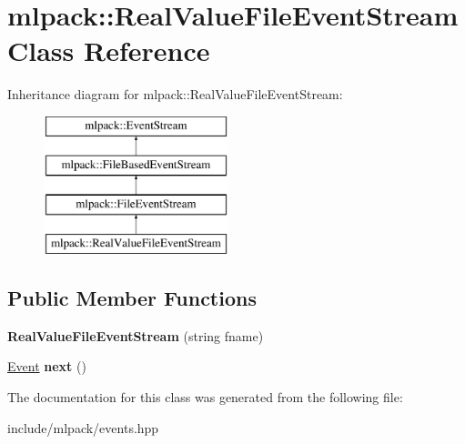 \hypertarget{classmlpack_1_1_real_value_file_event_stream}{
\section{mlpack::RealValueFileEventStream Class Reference}
\label{classmlpack_1_1_real_value_file_event_stream}
}
Inheritance diagram for mlpack::RealValueFileEventStream:\begin{figure}[H]
\begin{center}
\leavevmode
\includegraphics[height=4.000000cm]{classmlpack_1_1_real_value_file_event_stream}
\end{center}
\end{figure}
\subsection*{Public Member Functions}
\begin{DoxyCompactItemize}
\item 
\hypertarget{classmlpack_1_1_real_value_file_event_stream_a1fef86991b34d2425cbbd7fea9d86da4}{
{\bfseries RealValueFileEventStream} (string fname)}
\label{classmlpack_1_1_real_value_file_event_stream_a1fef86991b34d2425cbbd7fea9d86da4}

\item 
\hypertarget{classmlpack_1_1_real_value_file_event_stream_abe8738da0cba6334ab463d2d9b660f52}{
\hyperlink{structmlpack_1_1_event}{Event} {\bfseries next} ()}
\label{classmlpack_1_1_real_value_file_event_stream_abe8738da0cba6334ab463d2d9b660f52}

\end{DoxyCompactItemize}


The documentation for this class was generated from the following file:\begin{DoxyCompactItemize}
\item 
include/mlpack/events.hpp\end{DoxyCompactItemize}
